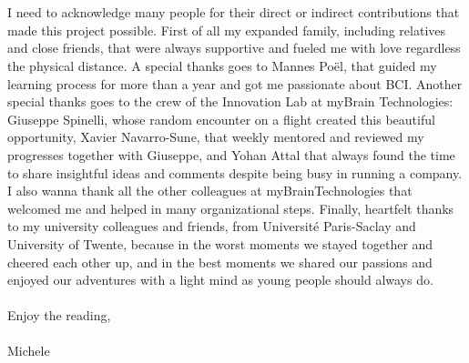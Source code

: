 \\
\\
I need to acknowledge many people for their direct or indirect contributions that made this project possible. First of all my expanded family, including relatives and close friends, that were always supportive and fueled me with love regardless the physical distance. A special thanks goes to Mannes Poël, that guided my learning process for more than a year and got me passionate about BCI. Another special thanks goes to the crew of the Innovation Lab at myBrain Technologies: Giuseppe Spinelli, whose random encounter on a flight created this beautiful opportunity, Xavier Navarro-Sune, that weekly mentored and reviewed my progresses together with Giuseppe, and Yohan Attal that always found the time to share insightful ideas and comments despite being busy in running a company. I also wanna thank all the other colleagues at myBrainTechnologies that welcomed me and helped in many organizational steps. Finally, heartfelt thanks to my university colleagues and friends, from Université Paris-Saclay and University of Twente, because in the worst moments we stayed together and cheered each other up, and in the best moments we shared our passions and enjoyed our adventures with a light mind as young people should always do. 
\\
\\
Enjoy the reading,
\\
\\
Michele






